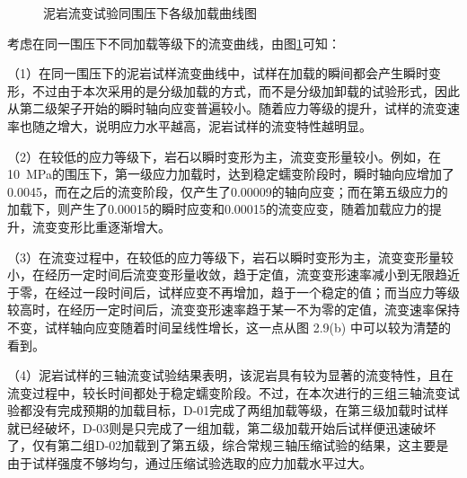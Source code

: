 \begin{figure}[ht!]
    \centering
    \centering
    \caption{泥岩流变试验同围压下各级加载曲线图}
    \label{fig:2-12}
\end{figure}

考虑在同一围压下不同加载等级下的流变曲线，由图\ref{fig:2-12}可知：

（1）在同一围压下的泥岩试样流变曲线中，试样在加载的瞬间都会产生瞬时变形，不过由于本次采用的是分级加载的方式，而不是分级加卸载的试验形式，因此从第二级架子开始的瞬时轴向应变普遍较小。随着应力等级的提升，试样的流变速率也随之增大，说明应力水平越高，泥岩试样的流变特性越明显。

（2）在较低的应力等级下，岩石以瞬时变形为主，流变变形量较小。例如，在\SI{10}{MPa}的围压下，第一级应力加载时，达到稳定蠕变阶段时，瞬时轴向应增加了0.0045，而在之后的流变阶段，仅产生了0.00009的轴向应变；而在第五级应力的加载下，则产生了0.00015的瞬时应变和0.00015的流变应变，随着加载应力的提升，流变变形比重逐渐增大。

（3）在流变过程中，在较低的应力等级下，岩石以瞬时变形为主，流变变形量较小，在经历一定时间后流变变形量收敛，趋于定值，流变变形速率减小到无限趋近于零，在经过一段时间后，试样应变不再增加，趋于一个稳定的值；而当应力等级较高时，在经历一定时间后，流变变形速率趋于某一不为零的定值，流变速率保持不变，试样轴向应变随着时间呈线性增长，这一点从图 2.9(b) 中可以较为清楚的看到。

（4）泥岩试样的三轴流变试验结果表明，该泥岩具有较为显著的流变特性，且在流变过程中，较长时间都处于稳定蠕变阶段。不过，在本次进行的三组三轴流变试验都没有完成预期的加载目标，D-01完成了两组加载等级，在第三级加载时试样就已经破坏，D-03则是只完成了一组加载，第二级加载开始后试样便迅速破坏了，仅有第二组D-02加载到了第五级，综合常规三轴压缩试验的结果，这主要是由于试样强度不够均匀，通过压缩试验选取的应力加载水平过大。

